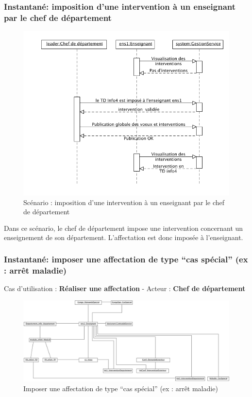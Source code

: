  \subsubsection{Instantané: imposition d'une intervention à un enseignant par le chef de département}
 \begin{figure}[!htbp]
 \begin{center}
 \includegraphics[width=15cm]{fig/scenario3.jpg}
 \caption{Scénario : imposition d'une intervention à un enseignant par le chef de département}
 \end{center}
 \end{figure}

 Dans ce scénario, le chef de département impose une intervention concernant un enseignement de son département. L'affectation est donc imposée à l'enseignant.  

 \subsubsection{Instantané: imposer une affectation de type ``cas spécial'' (ex : arrêt maladie)}
 \indent Cas d'utilisation : \textbf{Réaliser une affectation} - Acteur : \textbf{Chef de département}

 \begin{figure}[!htbp]
 \begin{center}
 \includegraphics[width=14cm]{fig/10-ImpositionCasSpecial.jpg}
 \caption{Imposer une affectation de type ``cas spécial'' (ex : arrêt maladie)}
 \end{center}
 \end{figure}

